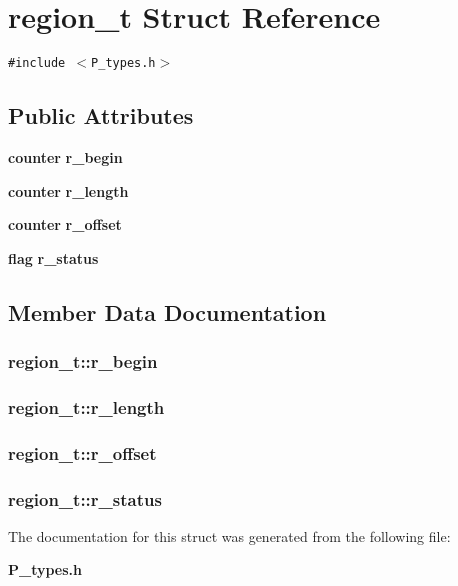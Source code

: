 \section{region\_\-t  Struct Reference}
\label{structregion__t}
{\tt \#include $<$P\_\-types.h$>$}

\subsection*{Public Attributes}
\begin{CompactItemize}
\item 
{\bf counter} {\bf r\_\-begin}
\item 
{\bf counter} {\bf r\_\-length}
\item 
{\bf counter} {\bf r\_\-offset}
\item 
{\bf flag} {\bf r\_\-status}
\end{CompactItemize}


\subsection{Member Data Documentation}
\subsubsection{ region\_\-t::r\_\-begin}\label{structregion__t_m0}


\subsubsection{ region\_\-t::r\_\-length}\label{structregion__t_m1}


\subsubsection{ region\_\-t::r\_\-offset}\label{structregion__t_m2}


\subsubsection{ region\_\-t::r\_\-status}\label{structregion__t_m3}




The documentation for this struct was generated from the following file:\begin{CompactItemize}
\item 
{\bf P\_\-types.h}\end{CompactItemize}
